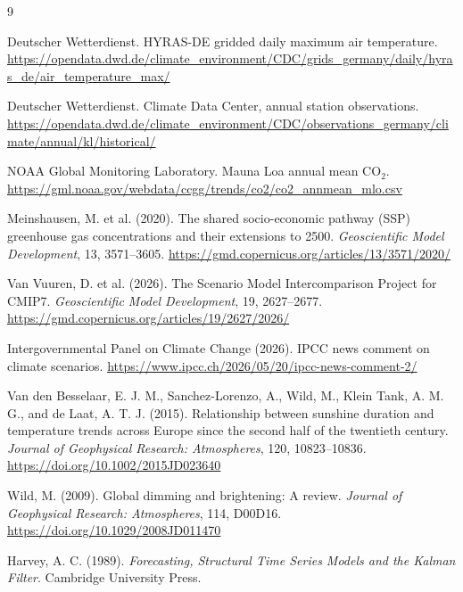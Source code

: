 \documentclass[11pt,a4paper]{article}
\begin{document}
\begin{thebibliography}{9}

Deutscher Wetterdienst.
\newblock HYRAS-DE gridded daily maximum air temperature.
\newblock \url{https://opendata.dwd.de/climate_environment/CDC/grids_germany/daily/hyras_de/air_temperature_max/}

Deutscher Wetterdienst.
\newblock Climate Data Center, annual station observations.
\newblock \url{https://opendata.dwd.de/climate_environment/CDC/observations_germany/climate/annual/kl/historical/}

NOAA Global Monitoring Laboratory.
\newblock Mauna Loa annual mean CO$_2$.
\newblock \url{https://gml.noaa.gov/webdata/ccgg/trends/co2/co2_annmean_mlo.csv}

Meinshausen, M. et al. (2020).
\newblock The shared socio-economic pathway (SSP) greenhouse gas concentrations and their extensions to 2500.
\newblock \emph{Geoscientific Model Development}, 13, 3571--3605.
\newblock \url{https://gmd.copernicus.org/articles/13/3571/2020/}

Van Vuuren, D. et al. (2026).
\newblock The Scenario Model Intercomparison Project for CMIP7.
\newblock \emph{Geoscientific Model Development}, 19, 2627--2677.
\newblock \url{https://gmd.copernicus.org/articles/19/2627/2026/}

Intergovernmental Panel on Climate Change (2026).
\newblock IPCC news comment on climate scenarios.
\newblock \url{https://www.ipcc.ch/2026/05/20/ipcc-news-comment-2/}

Van den Besselaar, E. J. M., Sanchez-Lorenzo, A., Wild, M., Klein Tank, A. M. G.,
and de Laat, A. T. J. (2015).
\newblock Relationship between sunshine duration and temperature trends across
Europe since the second half of the twentieth century.
\newblock \emph{Journal of Geophysical Research: Atmospheres}, 120, 10823--10836.
\newblock \url{https://doi.org/10.1002/2015JD023640}

Wild, M. (2009).
\newblock Global dimming and brightening: A review.
\newblock \emph{Journal of Geophysical Research: Atmospheres}, 114, D00D16.
\newblock \url{https://doi.org/10.1029/2008JD011470}

Harvey, A. C. (1989).
\newblock \emph{Forecasting, Structural Time Series Models and the Kalman Filter}.
\newblock Cambridge University Press.

\end{thebibliography}
\end{document}
